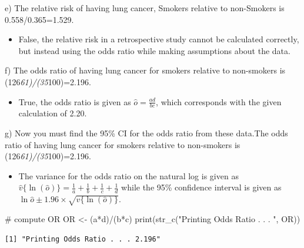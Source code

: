 \documentclass[
  letterpaper,
  DIV=11,
  numbers=noendperiod]{scrartcl}
\newenvironment{Shaded}{\begin{snugshade}}{\end{snugshade}}
\newcommand{\CommentTok}[1]{\textcolor[rgb]{0.37,0.37,0.37}{#1}}
\newcommand{\FunctionTok}[1]{\textcolor[rgb]{0.28,0.35,0.67}{#1}}
\newcommand{\NormalTok}[1]{\textcolor[rgb]{0.00,0.23,0.31}{#1}}
\newcommand{\OtherTok}[1]{\textcolor[rgb]{0.00,0.23,0.31}{#1}}
\newcommand{\SpecialCharTok}[1]{\textcolor[rgb]{0.37,0.37,0.37}{#1}}
\newcommand{\StringTok}[1]{\textcolor[rgb]{0.13,0.47,0.30}{#1}}
\providecommand{\tightlist}{%
  \setlength{\itemsep}{0pt}\setlength{\parskip}{0pt}}\usepackage{longtable,booktabs,array}
\begin{document}
e) The relative risk of having lung cancer, Smokers relative to
non-Smokers is 0.558/0.365=1.529.

\begin{itemize}
\tightlist
\item
  False, the relative risk in a retrospective study cannot be calculated
  correctly, but instead using the odds ratio while making assumptions
  about the data.
\end{itemize}

f) The odds ratio of having lung cancer for smokers relative to
non-smokers is (126\emph{61)/(35}100)=2.196.

\begin{itemize}
\tightlist
\item
  True, the odds ratio is given as \(\hat{o} = \frac{ad}{bc}\), which
  corresponds with the given calculation of 2.20.
\end{itemize}

g) Now you must find the 95\% CI for the odds ratio from these data.The
odds ratio of having lung cancer for smokers relative to non-smokers is
(126\emph{61)/(35}100)=2.196.

\begin{itemize}
\tightlist
\item
  The variance for the odds ratio on the natural log is given as
  \(\hat{v}\{\ln(\hat{o}) \} = \frac{1}{a} + \frac{1}{b} + \frac{1}{c} + \frac{1}{d}\)
  while the 95\% confidence interval is given as
  \(\ln{\hat{o}} \pm 1.96 \times \sqrt{\hat{v}\{\ln(\hat{o}) \}}\).
\end{itemize}

\begin{Shaded}
\begin{Highlighting}[]
\CommentTok{\# compute OR }
\NormalTok{OR }\OtherTok{\textless{}{-}}\NormalTok{ (a}\SpecialCharTok{*}\NormalTok{d)}\SpecialCharTok{/}\NormalTok{(b}\SpecialCharTok{*}\NormalTok{c)}
\FunctionTok{print}\NormalTok{(}\FunctionTok{str\_c}\NormalTok{(}\StringTok{"Printing Odds Ratio . . . "}\NormalTok{, OR))}
\end{Highlighting}
\end{Shaded}

\begin{verbatim}
[1] "Printing Odds Ratio . . . 2.196"
\end{verbatim}
\end{document}
